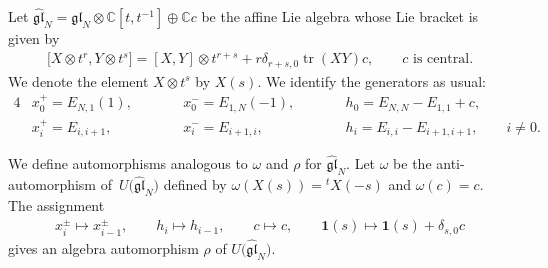 \documentclass[pdftex]{sigma}
\theoremstyle{definition}
\numberwithin{equation}{section}
\DeclareMathOperator{\tr}{tr}
\newcommand{\bbC}{\mathbb{C}}
\newcommand{\gl}{\mathfrak{gl}}
\newcommand{\bfid}{\mathbf{1}}
\begin{document}
Let $\hat{\gl}_N = \gl_N \otimes \bbC[t,t^{-1}] \oplus \bbC c$ be the affine Lie algebra whose Lie bracket is given by
\begin{gather*}
\big[X \otimes t^{r}, Y \otimes t^{s}\big] = [X,Y] \otimes t^{r+s} + r \delta_{r+s,0} \tr(XY) c, \qquad \text{$c$ is central}.
\end{gather*}
We denote the element $X \otimes t^s$ by $X(s)$. We identify the generators as usual:
\begin{alignat*}{4}
& x_0^+= E_{N,1}(1), \qquad && x_0^{-} = E_{1,N}(-1), \qquad && h_0= E_{N,N} - E_{1,1} + c,&\\
& x_{i}^{+}= E_{i,i+1}, \qquad && x_i^{-}= E_{i+1,i}, \qquad &&h_i= E_{i,i}-E_{i+1,i+1}, \qquad i \neq 0.&
\end{alignat*}

We define automorphisms analogous to $\omega$ and $\rho$ for $\hat{\gl}_N$. Let $\omega$ be the anti-automorphism of~${U}\big(\hat{\gl}_N\big)$ defined by $\omega(X(s))= {}^{t}X(-s)$ and $\omega(c)=c$.
The assignment
\begin{gather*}
x_i^{\pm} \mapsto x_{i-1}^{\pm}, \qquad h_i \mapsto h_{i-1}, \qquad c \mapsto c, \qquad \bfid(s) \mapsto \bfid(s) + \delta_{s,0}c
\end{gather*}
gives an algebra automorphism $\rho$ of $U\big(\hat{\gl}_N\big)$.
\end{document}
